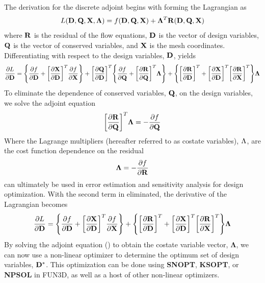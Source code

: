 The derivation for the discrete adjoint begins with forming the Lagrangian as
\begin{equation}
  L(\mathbf D,\mathbf Q,\mathbf X,\mathbf{\Lambda})=f(\mathbf D,\mathbf Q,\mathbf X)
  +\mathbf{\Lambda}^T\mathbf R(\mathbf D,\mathbf Q,\mathbf X)
  \label{lagrangian}
\end{equation}
where $\mathbf R$ is the residual of the flow equations, $\mathbf D$ is the vector of design
variables, $\mathbf Q$ is the vector of conserved variables, and $\mathbf X$ is the mesh
coordinates.  Differentiating with respect to the design variables, $\mathbf D$,
yields
\begin{equation}
  \frac{\partial L}{\partial \mathbf D} = 
  \Bigg\{\frac{\partial f}{\partial \mathbf D}+\bigg[\frac{\partial \mathbf X}{\partial \mathbf D}\bigg]^T \frac{\partial f}{\partial \mathbf X}\Bigg\} 
  + \bigg[\frac{\partial \mathbf Q}{\partial \mathbf D}\bigg]^T
  \Bigg\{\frac{\partial f}{\partial \mathbf Q}+\bigg[\frac{\partial \mathbf R}{\partial \mathbf Q}\bigg]^T \mathbf{\Lambda}\Bigg\}
  +\Bigg\{\bigg[\frac{\partial \mathbf R}{\partial \mathbf D}\bigg]^T
  +\bigg[\frac{\partial \mathbf X}{\partial \mathbf D}\bigg]^T\bigg[\frac{\partial \mathbf R}{\partial \mathbf X}\bigg]^T\Bigg\}\mathbf{\Lambda}
  \label{dL}
\end{equation}
To eliminate the dependence of conserved variables, $\mathbf Q$, on the design
variables, we solve the adjoint equation
\begin{equation}
  \bigg[\frac{\partial \mathbf R}{\partial \mathbf Q}\bigg]^T\mathbf{\Lambda} = -\frac{\partial f}{\partial \mathbf Q}
  \label{adjoint-main}
\end{equation}
Where the Lagrange multipliers (hereafter referred to as costate variables),
$\Lambda_{}$, are the cost function dependence on the residual
\begin{equation}
  \mathbf{\Lambda}=-\frac{\partial f}{\partial \mathbf R}
\end{equation}
 can ultimately be used in error estimation and sensitivity analysis
for design optimization.  With the second term in  eliminated, the
derivative of the Lagrangian becomes
\begin{equation}
  \frac{\partial L}{\partial \mathbf D}=
  \Bigg\{\frac{\partial f}{\partial \mathbf D}+\bigg[\frac{\partial \mathbf X}{\partial \mathbf D}\bigg]^T \frac{\partial f}{\partial \mathbf X}\Bigg\}
  +\Bigg\{\bigg[\frac{\partial \mathbf R}{\partial \mathbf D}\bigg]^T
  +\bigg[\frac{\partial \mathbf X}{\partial \mathbf D}\bigg]^T\bigg[\frac{\partial \mathbf R}{\partial \mathbf X}\bigg]^T\Bigg\}\mathbf{\Lambda}
  \label{obj-function}
\end{equation}
By solving the adjoint equation () to obtain the costate
variable vector, $\mathbf{\Lambda}$, we can now use a non-linear optimizer to
determine the optimum set of design variables, $\mathbf D^*$. This optimization can be
done using {\bf SNOPT\cite{snopt-manual}}, {\bf KSOPT\cite{KSOPT}}, or {\bf
NPSOL\cite{npsol-manual}} in FUN3D, as well as a host of other non-linear
optimizers.

